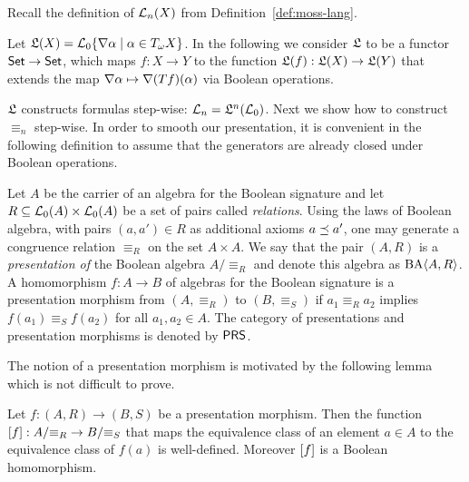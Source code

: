 \documentclass{book}
\begin{document}
Recall the definition of $\mathcal{L}_{n}(X)$ from
Definition~\ref{def:moss-lang}.

\begin{definition}
  Let $\mathfrak{L}(X)=\mathcal{L}_0\{\nabla\alpha\mid\alpha\in T_{\omega} X\}$.
  In the following we consider $\mathfrak{L}$ to be a functor
  $\mathsf{Set}\to\mathsf{Set}$, which maps $f:X \to Y$ to the function
  $\mathfrak{L}(f):\mathfrak{L}(X)\to\mathfrak{L}(Y)$ that extends the map $\nabla \alpha
  \mapsto \nabla (T f)(\alpha)$ via Boolean operations.
\end{definition}

\noindent $\mathfrak{L}$ constructs formulas step-wise:
$\mathcal{L}_n=\mathfrak{L}^n(\mathcal{L}_0)$.  Next we show how to construct
$\equiv_n$ step-wise.  In order to smooth our presentation, it is
convenient in the following definition to assume that the generators
are already closed under Boolean operations.


\begin{definition}
  Let $A$ be the carrier of an algebra for the Boolean signature and
  let $R \subseteq \mathcal{L}_0(A) \times \mathcal{L}_0(A)$ be a set of pairs
  called \emph{relations}.  Using the laws of Boolean algebra, with
  pairs $(a,a') \in R$ as additional axioms $a \preceq a'$, one may
  generate a congruence relation $\equiv_{R}$ on the set $A \times A$.
  We say that the pair $(A,R)$ is a \emph{presentation of} the Boolean
  algebra $A/{\equiv_{R}}$ and denote this algebra as $\mathrm{BA}\langle A, R \rangle$.  A
  homomorphism $f:A \to B$ of algebras for the Boolean signature is a
  presentation morphism from $(A,\equiv_R)$ to $(B,\equiv_{S})$ if
  $a_1 \equiv_R a_2$ implies $f(a_1) \equiv_{S} f(a_2)$ for all
  $a_1,a_2 \in A$.  The category of presentations and presentation
  morphisms is denoted by $\mathsf{PRS}$.
\end{definition}

The notion of a presentation morphism is motivated by the following lemma
which is not difficult to prove.

\begin{lemma}\label{lem:presmor}
Let $f:(A,R) \to (B,S)$ be a presentation morphism. 
Then the function $[f]: A/{\equiv_R} \to B/{\equiv_S}$ that maps the
equivalence class of an element $a\in A$ to the equivalence class of $f(a)$
is well-defined.
Moreover $[f]$ is a Boolean homomorphism. 
\end{lemma}
\end{document}
